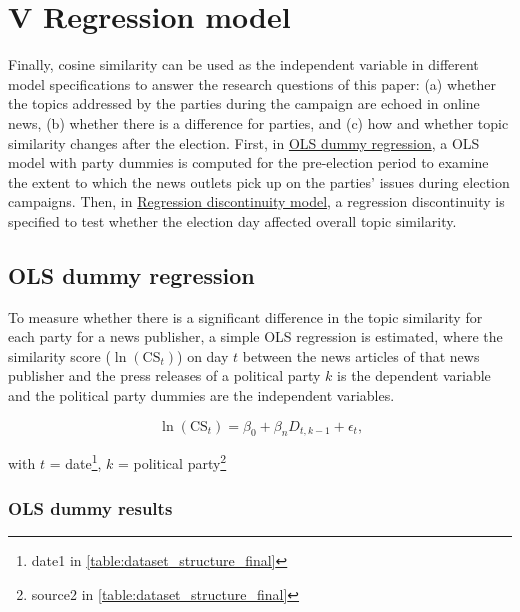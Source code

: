 \documentclass[
]{article}
\begin{document}
\hypertarget{v-regression-model}{%
\section{V Regression model}\label{v-regression-model}}

Finally, cosine similarity can be used as the independent variable in
different model specifications to answer the research questions of this
paper: (a) whether the topics addressed by the parties during the
campaign are echoed in online news, (b) whether there is a difference
for parties, and (c) how and whether topic similarity changes after the
election. First, in \protect\hyperlink{ols-dummy-regression}{OLS dummy
regression}, a OLS model with party dummies is computed for the
pre-election period to examine the extent to which the news outlets pick
up on the parties' issues during election campaigns. Then, in
\protect\hyperlink{regression-discontinuity-model}{Regression
discontinuity model}, a regression discontinuity is specified to test
whether the election day affected overall topic similarity.

\hypertarget{ols-dummy-regression}{%
\subsection{OLS dummy regression}\label{ols-dummy-regression}}

To measure whether there is a significant difference in the topic
similarity for each party for a news publisher, a simple OLS regression
is estimated, where the similarity score (\(\ln(\text{CS}_{t})\)) on day
\(t\) between the news articles of that news publisher and the press
releases of a political party \(k\) is the dependent variable and the
political party dummies are the independent variables.

\[
\ln(\text{CS}_{t})=\beta_0+\beta_nD_{t,k-1}+\epsilon_t\text{,}
\]

with \(t\) = date\footnote{date1 in
  \autoref{table:dataset_structure_final}}, \(k\) = political
party\footnote{source2 in \autoref{table:dataset_structure_final}}

\hypertarget{ols-dummy-results}{%
\subsubsection{OLS dummy results}\label{ols-dummy-results}}
\end{document}
